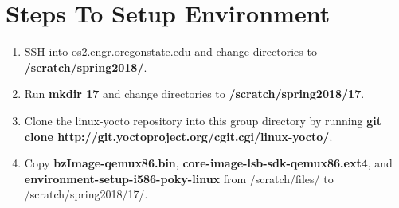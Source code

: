 \documentclass[onecolumn,draftclsnofoot, 10pt, compsoc]{IEEEtran}
\def \GroupNumber{17\xspace}
\begin{document}
\section{Steps To Setup Environment}
	\begin{enumerate}
		\item
			SSH into os2.engr.oregonstate.edu and change directories to \textbf{/scratch/spring2018/}.
		\item
			Run \textbf{mkdir \GroupNumber} and change directories to \textbf{/scratch/spring2018/\GroupNumber}.
		\item
			Clone the linux-yocto repository into this group directory by running \textbf{git clone http://git.yoctoproject.org/cgit.cgi/linux-yocto/}.
		\item 
			Copy \textbf{bzImage-qemux86.bin}, \textbf{core-image-lsb-sdk-qemux86.ext4}, and \textbf{environment-setup-i586-poky-linux} from /scratch/files/ to /scratch/spring2018/17/.
	\end{enumerate}
\end{document}
